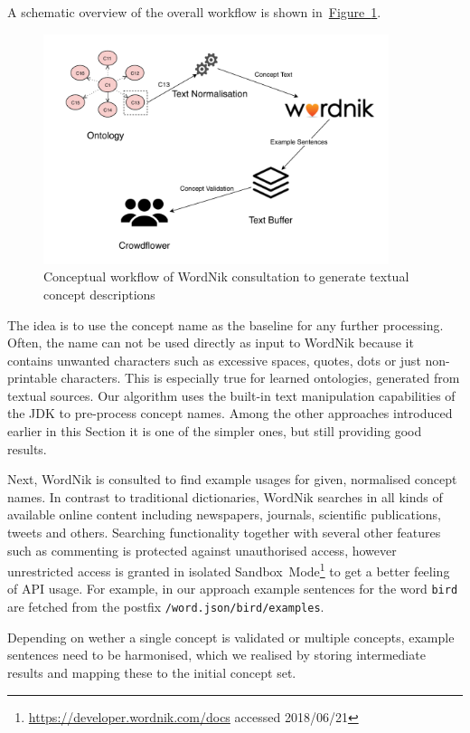 \documentclass[draft,final]{vutinfth} %
\begin{document}
A schematic overview of the overall workflow is shown in~\hyperref[fig:external_source_workflow]{Figure~\ref*{fig:external_source_workflow}}.
\begin{figure}
	 \centering
	 \includegraphics[width=0.9\textwidth]{drawio/External_Source_Workflow}
	 \caption{Conceptual workflow of WordNik consultation to generate textual concept descriptions}\label{fig:external_source_workflow}
\end{figure}
The idea is to use the concept name as the baseline for any further processing. Often, the name can not be used directly as input to WordNik because it contains unwanted characters such as excessive spaces, quotes, dots or just non-printable characters. This is especially true for learned ontologies, generated from textual sources. Our algorithm uses the built-in text manipulation capabilities of the JDK to pre-process concept names. Among the other approaches introduced earlier in this Section it is one of the simpler ones, but still providing good results. 

Next, WordNik is consulted to find example usages for given, normalised concept names. In contrast to traditional dictionaries, WordNik searches in all kinds of available online content including newspapers, journals, scientific publications, tweets and others. Searching functionality together with several other features such as commenting is protected against unauthorised access, however unrestricted access is granted in isolated Sandbox~Mode\footnote{\url{https://developer.wordnik.com/docs} accessed  2018/06/21} to get a better feeling of API usage. For example, in our approach example sentences for the word \texttt{bird} are fetched from the postfix \texttt{/word.json/bird/examples}.

Depending on wether a single concept is validated or multiple concepts, example sentences need to be harmonised, which we realised by storing intermediate results and mapping these to the initial concept set. 
\end{document}
